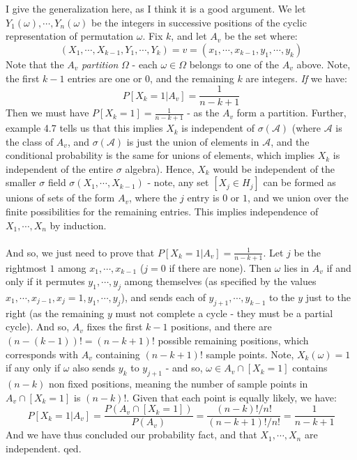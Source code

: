 \documentclass[12pt,a4paper]{article}
\newcommand{\1}[1]{\mathbbm{1}\left\{ #1 \right\}}
\newcommand{\acal}{\mathcal{A}}
\begin{document}
\\\\
I give the generalization here, as I think it is a good argument. We let $Y_1(\omega), \cdots, Y_n(\omega)$ be the integers in successive positions of the cyclic representation of permutation $\omega$. Fix $k$, and let $A_v$ be the set where:
$$
	(X_1, \cdots, X_{k-1}, Y_1, \cdots, Y_k) = v = (x_1, \cdots, x_{k-1}, y_1, \cdots, y_k)
$$
Note that the $A_v$ \textit{partition} $\Omega$ - each $\omega \in \Omega$ belongs to one of the $A_v$ above. Note, the first $k-1$ entries are one or $0$, and the remaining $k$ are integers. \textit{If} we have:
$$
	P[X_k = 1 | A_v] = \frac{1}{n-k+1}
$$
Then we must have $P[X_k = 1] = \frac{1}{n-k+1}$ - as the $A_v$ form a partition. Further, example 4.7 tells us that this implies $X_k$ is independent of $\sigma(\acal)$ (where $\acal$ is the class of $A_v$, and $\sigma(\acal)$ is just the union of elements in $\acal$, and the conditional probability is the same for unions of elements, which implies $X_k$ is independent of the entire $\sigma$ algebra). Hence, $X_k$ would be independent of the smaller $\sigma$ field $\sigma(X_1, \cdots, X_{k-1})$ - note, any set $[X_j \in H_j]$ can be formed as unions of sets of the form $A_v$, where the $j$ entry is $0$ or $1$, and we union over the finite possibilities for the remaining entries. This implies independence of $X_1, \cdots, X_n$ by induction.
\\\\
And so, we just need to prove that $P[X_k = 1 | A_v] = \frac{1}{n-k+1}$. Let $j$ be the rightmost $1$ among $x_1, \cdots, x_{k-1}$ ($j = 0$ if there are none). Then $\omega$ lies in $A_v$ if and only if it permutes $y_1, \cdots, y_j$ among themselves (as specified by the values $x_1, \cdots, x_{j-1}, x_j = 1, y_1, \cdots, y_j$), and sends each of $y_{j+1}, \cdots, y_{k-1}$ to the $y$ just to the right (as the remaining $y$ must not complete a cycle - they must be a partial cycle). And so, $A_v$ fixes the first $k-1$ positions, and there are $(n - (k - 1))! = (n - k + 1)!$ possible remaining positions, which corresponds with $A_v$ containing $(n - k + 1)!$ sample points. Note, $X_k(\omega) = 1$ if any only if $\omega$ also sends $y_k$ to $y_{j + 1}$ - and so, $\omega \in A_v \cap [X_k = 1]$ contains $(n - k)$ non fixed positions, meaning the number of sample points in $A_v \cap [X_k = 1]$ is $(n-k)!$. Given that each point is equally likely, we have:
$$
	P[X_k = 1 | A_v] = \frac{P\left(A_v \cap [X_k = 1]\right)}{P(A_v)} =
	\frac{(n-k)!/n!}{(n-k+1)!/n!} = \frac{1}{n - k + 1}
$$
And we have thus concluded our probability fact, and that $X_1, \cdots, X_n$ are independent. qed.
\end{document}
